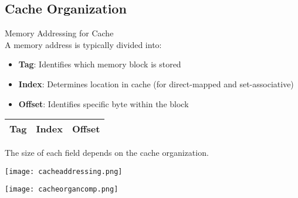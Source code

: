 \raggedcolumns
\columnbreak

\subsection{Cache Organization}


\begin{definition}{Memory Addressing for Cache}\\
A memory address is typically divided into:
\begin{itemize}
    \item \textbf{Tag}: Identifies which memory block is stored
    \item \textbf{Index}: Determines location in cache (for direct-mapped and set-associative)
    \item \textbf{Offset}: Identifies specific byte within the block
\end{itemize}
\begin{center}
\begin{tabular}{|c|c|c|}
\hline
Tag & Index & Offset \\
\hline
\end{tabular}
\end{center}
The size of each field depends on the cache organization.

\texttt{[image: cacheaddressing.png]}
\end{definition}

\begin{center}
\texttt{[image: cacheorgancomp.png]}
\end{center}

